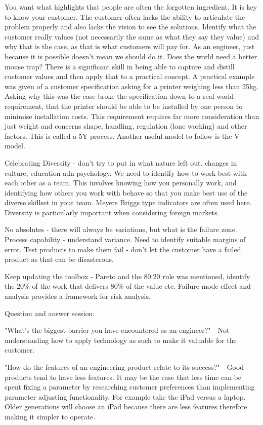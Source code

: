 You want what highlights that people are often the forgotten ingredient. It is key to know your customer. The customer often lacks the ability to articulate the problem properly and also lacks the vision to see the solutions. Identify what the customer really values (not necessarily the same as what they say they value) and why that is the case, as that is what customers will pay for. As an engineer, just because it is possible doesn't mean we should do it. Does the world need a better mouse trap? There is a significant skill in being able to capture and distill customer values and then apply that to a practical concept. A practical example was given of a customer specification asking for a printer weighing less than 25kg. Asking why this was the case broke the specification down to a real world requirement, that the printer should be able to be installed by one person to minimise installation costs. This requirement requires far more consideration than just weight and concerns shape, handling, regulation (lone working) and other factors. This is called a 5Y process. Another useful model to follow is the V-model.

Celebrating Diversity - don't try to put in what nature left out. changes in culture, education adn psychology. We need to identify how to work best with each other as a team. This involves knowing how you personally work, and identifying how others you work with behave so that you make best use of the diverse skillset in your team. Meyers Briggs type indicators are often used here. Diversity is particularly important when considering foreign markets. 

No absolutes - there will always be variations, but what is the failure zone. Process capability - understand variance. Need to identify suitable margins of error. Test products to make them fail - don't let the customer have a failed product as that can be disasterous. 

Keep updating the toolbox - Pareto and the 80:20 rule was mentioned, identify the 20\% of the work that delivers 80\% of the value etc. Failure mode effect and analysis provides a framework for risk analysis. 


Question and answer session:

"What's the biggest barrier you have encountered as an engineer?" - 
Not understanding how to apply technology as such to make it valuable for the customer. 

"How do the features of an engineering product relate to its success?" - 
Good products tend to have less features. 
It may be the case that less time can be spent fixing a parameter by researching customer preferences than implementing parameter adjusting functionality.
For example take the iPad versus a laptop.
Older generations will choose an iPad because there are less features therefore making it simpler to operate.

